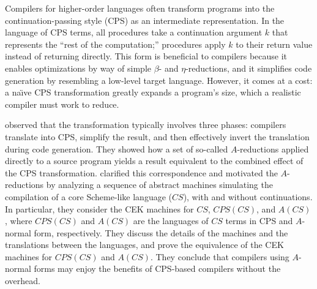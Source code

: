 \documentclass[11pt]{article}
\begin{document}
\thispagestyle{fancy}

Compilers for higher-order languages often transform programs into the
continuation-passing style (CPS) as an intermediate representation. In the
language of CPS terms, all procedures take a continuation argument $k$
that represents the ``rest of the computation;'' procedures apply $k$ to their
return value instead of returning directly. This form is beneficial to
compilers because it enables optimizations by way of simple $\beta$- and
$\eta$-reductions, and it simplifies code generation by resembling a low-level
target language. However, it comes at a cost: a na\"{\i}ve CPS transformation
greatly expands a program's size, which a realistic compiler must work to
reduce.

\citet{Sabry:1992zr} observed that the transformation typically  involves
three phases: compilers translate into CPS, simplify the result, and then
effectively invert the translation during code generation. They showed how
a set of so-called $A$-reductions applied directly to a source program yields a
result equivalent to the combined effect of the CPS transformation.
\citet{Flanagan:1993fk} clarified this correspondence and motivated the
$A$-reductions by analyzing a sequence of abstract machines simulating the
compilation of a core Scheme-like language ($\mathit{CS}$), with and without
continuations. In particular, they consider the CEK machines for $\mathit{CS}$,
$\mathit{CPS}(\mathit{CS})$, and $A(\mathit{CS})$,  where
$\mathit{CPS}(\mathit{CS})$ and $A(\mathit{CS})$ are the languages of
$\mathit{CS}$ terms in CPS and $A$-normal form, respectively.
They discuss the details of the machines and the translations between the
languages, and prove the equivalence of the CEK machines for
$\mathit{CPS}(\mathit{CS})$ and $A(\mathit{CS})$. They conclude that compilers
using $A$-normal forms may enjoy the benefits of CPS-based compilers without
the overhead.

\end{document}
